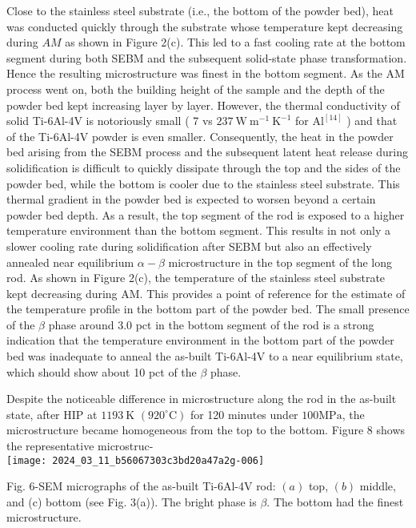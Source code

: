 \documentclass[10pt]{article}
\begin{document}
Close to the stainless steel substrate (i.e., the bottom of the powder bed), heat was conducted quickly through the substrate whose temperature kept decreasing during $A M$ as shown in Figure 2(c). This led to a fast cooling rate at the bottom segment during both SEBM and the subsequent solid-state phase transformation. Hence the resulting microstructure was finest in the bottom segment. As the AM process went on, both the building height of the sample and the depth of the powder bed kept increasing layer by layer. However, the thermal conductivity of solid Ti-6Al-4V is notoriously small ( 7 vs $237 \mathrm{~W} \mathrm{~m}^{-1} \mathrm{~K}^{-1}$ for $\mathrm{Al}^{[14]}$ ) and that of the Ti-6Al-4V powder is even smaller. Consequently, the heat in the powder bed arising from the SEBM process and the subsequent latent heat release during solidification is difficult to quickly dissipate through the top and the sides of the powder bed, while the bottom is cooler due to the stainless steel substrate. This thermal gradient in the powder bed is expected to worsen beyond a certain powder bed depth. As a result, the top segment of the rod is exposed to a higher temperature environment than the bottom segment. This results in not only a slower cooling rate during solidification after SEBM but also an effectively annealed near equilibrium $\alpha-\beta$ microstructure in the top segment of the long rod. As shown in Figure 2(c), the temperature of the stainless steel substrate kept decreasing during AM. This provides a point of reference for the estimate of the temperature profile in the bottom part of the powder bed. The small presence of the $\beta$ phase around 3.0 pct in the bottom segment of the rod is a strong indication that the temperature environment in the bottom part of the powder bed was inadequate to anneal the as-built Ti-6Al-4V to a near equilibrium state, which should show about 10 pct of the $\beta$ phase.

Despite the noticeable difference in microstructure along the rod in the as-built state, after HIP at $1193 \mathrm{~K}$ $\left(920^{\circ} \mathrm{C}\right)$ for 120 minutes under $100 \mathrm{MPa}$, the microstructure became homogeneous from the top to the bottom. Figure 8 shows the representative microstruc-\\
\texttt{[image: 2024\_03\_11\_b56067303c3bd20a47a2g-006]}

Fig. 6-SEM micrographs of the as-built Ti-6Al-4V rod: $(a)$ top, $(b)$ middle, and (c) bottom (see Fig. 3(a)). The bright phase is $\beta$. The bottom had the finest microstructure.
\end{document}
